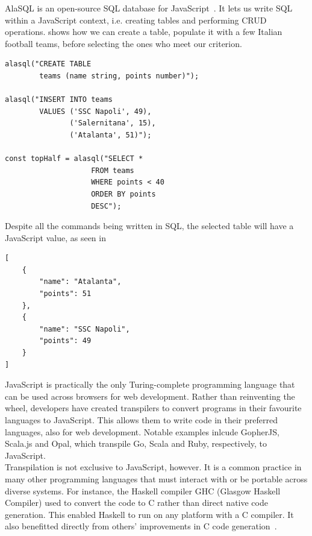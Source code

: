 AlaSQL is an open-source SQL database for JavaScript~\cite{alaSQL}. It lets us write SQL within a JavaScript context, i.e. creating tables and performing CRUD operations.  shows how we can create a table, populate it with a few Italian football teams, before selecting the ones who meet our criterion. \\

\begin{lstlisting}[caption={JavaScript code to create, populate and select a table with AlaSQL.}, captionpos=b, label={JavaScript AlaSQL.}]
alasql("CREATE TABLE
        teams (name string, points number)");

alasql("INSERT INTO teams
        VALUES ('SSC Napoli', 49),
               ('Salernitana', 15),
               ('Atalanta', 51)");

const topHalf = alasql("SELECT *
                    FROM teams
                    WHERE points < 40
                    ORDER BY points
                    DESC");
\end{lstlisting}

Despite all the commands being written in SQL, the selected table will have a JavaScript value, as seen in  \\

\begin{lstlisting}[caption={The value of topHalf from \Cref{JavaScript AlaSQL.}}, captionpos=b, label={The value of topHalf}]
[
    {
        "name": "Atalanta",
        "points": 51
    },
    {
        "name": "SSC Napoli",
        "points": 49
    }
]
\end{lstlisting}

JavaScript is practically the only Turing-complete programming language that can be used across browsers for web development. Rather than reinventing the wheel, developers have created transpilers to convert programs in their favourite languages to JavaScript. This allows them to write code in their preferred languages, also for web development. Notable examples inlcude GopherJS, Scala.js and Opal, which transpile Go, Scala and Ruby, respectively, to JavaScript. \\

Transpilation is not exclusive to JavaScript, however. It is a common practice in many other programming languages that must interact with or be portable across diverse systems. For instance, the Haskell compiler GHC (Glasgow Haskell Compiler) used to convert the code to C rather than direct native code generation. This enabled Haskell to run on any platform with a C compiler. It also benefitted directly from others' improvements in C code generation~\cite{HaskellToC}. \\

